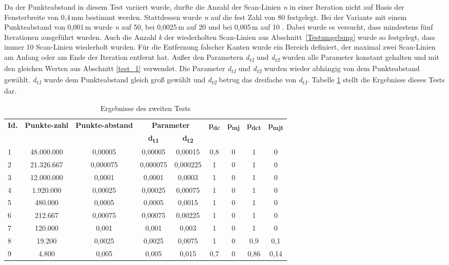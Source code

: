 Da der Punkteabstand in diesem Test variiert wurde, durfte die Anzahl der Scan-Linien \textit{n} in einer Iteration nicht auf Basis der Fensterbreite von 0,4\,\si{\mm} bestimmt werden. Stattdessen wurde \textit{n} auf die fest Zahl von 80 festgelegt. Bei der Variante mit einem Punkteabstand von 0,001\,\si{\m} wurde \textit{n} auf 50, bei 0,0025\,\si{\m} auf 20 und bei 0,005\,\si{\m} auf 10 . Dabei wurde es versucht, dass mindestens fünf Iterationen ausgeführt wurden. Auch die Anzahl \textit{k} der wiederholten Scan-Linien aus Abschnitt~\ref{Testumgebung} wurde so festgelegt, dass immer 10 Scan-Linien wiederholt wurden. Für die Entfernung falscher Kanten wurde ein Bereich definiert, der maximal zwei Scan-Linien am Anfang oder am Ende der Iteration entfernt hat. Außer den Parametern \textit{d\textsubscript{t1}} und \textit{d\textsubscript{t2}} wurden alle Parameter konstant gehalten und mit den gleichen Werten aus Abschnitt \ref{test_1} verwendet. Die Parameter \textit{d\textsubscript{t1}} und \textit{d\textsubscript{t2}} wurden wieder abhängig von dem Punkteabstand gewählt. \textit{d\textsubscript{t1}} wurde dem Punkteabstand gleich groß gewählt und \textit{d\textsubscript{t2}} betrug das dreifache von \textit{d\textsubscript{t1}}. Tabelle \ref{table: test_2_results} stellt die Ergebnisse dieses Tests dar.

\begin{table}[b]
	\centering
	\begin{tabular}[width = \textwidth]{l *{8}{c}}
		\hline
		\multirow{2}{2em}{\textbf{Id.}} & \multirow{2}{3em}{\textbf{Punkte-zahl}} & \multirow{2}{3em}{\textbf{Punkte-abstand}} & \multicolumn{2}{c}{\textbf{Parameter}} & \multirow{2}{*}{\textbf{p\textsubscript{dc}}} & \multirow{2}{*}{\textbf{p\textsubscript{mj}}} & \multirow{2}{*}{\textbf{p\textsubscript{dct}}} & \multirow{2}{*}{\textbf{p\textsubscript{mjt}}} \\
		& & & \textbf{d\textsubscript{t1}} &\textbf{d\textsubscript{t2}} & & & & \\
		\hline
		1 & 48.000.000 & 0,00005 & 0,00005 & 0,00015 & 0,8 & 0 & 1 & 0 \\
		2 & 21.326.667 & 0,000075 & 0,000075 & 0,000225 & 1 & 0 & 1 & 0 \\
		3 & 12.000.000 & 0,0001 & 0,0001 & 0,0003 & 1 & 0 & 1 & 0 \\
		4 & 1.920.000 & 0,00025 & 0,00025 & 0,00075 & 1 & 0 & 1 & 0 \\
		5 & 480.000 & 0,0005 & 0,0005 & 0,0015 & 1 & 0 & 1 & 0 \\
		6 & 212.667 & 0,00075 & 0,00075 & 0,00225 & 1 & 0 & 1 & 0 \\
		7 & 120.000 & 0,001	& 0,001 & 0,003 & 1 & 0 & 1 & 0 \\
		8 & 19.200 & 0,0025 & 0,0025 & 0,0075 & 1 & 0 & 0,9 & 0,1 \\
		9 & 4.800 & 0,005 & 0,005 & 0,015 & 0,7 & 0 & 0,86 & 0,14 \\
		\hline 
	\end{tabular}
	\caption{Ergebnisse des zweiten Tests}
	\label{table: test_2_results}
\end{table}

